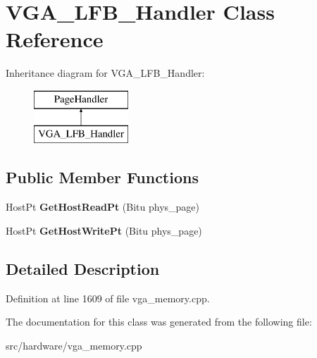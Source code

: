\hypertarget{classVGA__LFB__Handler}{\section{V\-G\-A\-\_\-\-L\-F\-B\-\_\-\-Handler Class Reference}
\label{classVGA__LFB__Handler}
}
Inheritance diagram for V\-G\-A\-\_\-\-L\-F\-B\-\_\-\-Handler\-:\begin{figure}[H]
\begin{center}
\leavevmode
\includegraphics[height=2.000000cm]{classVGA__LFB__Handler}
\end{center}
\end{figure}
\subsection*{Public Member Functions}
\begin{DoxyCompactItemize}
\item 
\hypertarget{classVGA__LFB__Handler_ad4cf94e4a3b186e307f54fc0ca5f8a33}{Host\-Pt {\bfseries Get\-Host\-Read\-Pt} (Bitu phys\-\_\-page)}\label{classVGA__LFB__Handler_ad4cf94e4a3b186e307f54fc0ca5f8a33}

\item 
\hypertarget{classVGA__LFB__Handler_abc42ff47ee5307b3de27bed8594a1354}{Host\-Pt {\bfseries Get\-Host\-Write\-Pt} (Bitu phys\-\_\-page)}\label{classVGA__LFB__Handler_abc42ff47ee5307b3de27bed8594a1354}

\end{DoxyCompactItemize}


\subsection{Detailed Description}


Definition at line 1609 of file vga\-\_\-memory.\-cpp.



The documentation for this class was generated from the following file\-:\begin{DoxyCompactItemize}
\item 
src/hardware/vga\-\_\-memory.\-cpp\end{DoxyCompactItemize}
